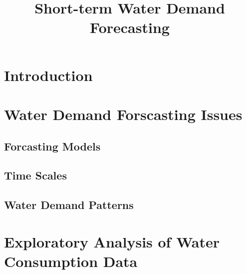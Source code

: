 \documentclass{sig-alternate}
\begin{document}
\title{Short-term Water Demand Forecasting}

\author{
\alignauthor
}
\maketitle

\begin{abstract}
\end{abstract}

\section{Introduction}

\section{Water Demand Forscasting Issues}

\subsection{Forcasting Models}

\subsection{Time Scales}

\subsection{Water Demand Patterns}

\section{Exploratory Analysis of Water Consumption Data}
\end{document}
